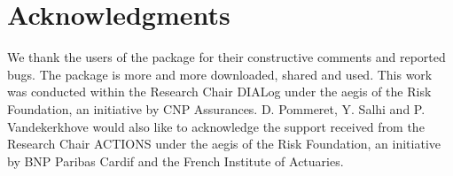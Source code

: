 \begin{table}[!h]
\centering
\caption{\label{tab:mispecification-latex}Effect of model misspecification on estimation error related to the proportion $p$, for the three estimators.}
\centering
{}
\end{table}

\section{Acknowledgments}\label{acknowledgments}

We thank the users of the package for their constructive comments and reported bugs. The package is more and more downloaded, shared and used. This work was conducted within the Research Chair DIALog under the aegis of the Risk Foundation, an initiative by CNP Assurances. D. Pommeret, Y. Salhi and P. Vandekerkhove would also like to acknowledge the support received from the Research Chair ACTIONS under the aegis of the Risk Foundation, an initiative by BNP Paribas Cardif and the French Institute of Actuaries.

